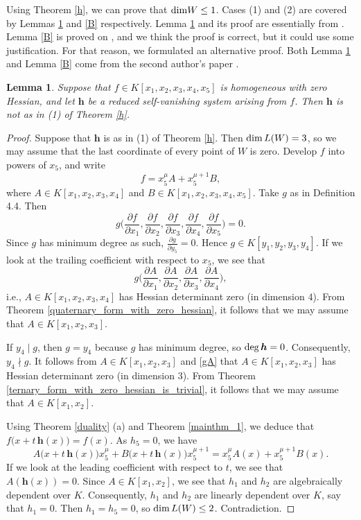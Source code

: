 \documentclass[12pt]{article}
\newtheorem{lemma}[theorem]{Lemma}
\theoremstyle{definition}
\theoremstyle{remark}
\def\dim{{\rm dim}}
\def\deg{{\rm deg}}
\def\pa{\partial}
\def\parder#1#2{\frac{\pa #1}{\pa #2}}
\begin{document}
Using Theorem \ref{h}, we can prove that $\dim W \le 1$. Cases (1) and (2) are 
covered by Lemmas \ref{A} and \ref{B} respectively. Lemma \ref{A} and its 
proof are essentially from \cite[p.\@ 567]{GNzzz}. Lemma \ref{B} is proved on 
\cite[p.\@ 568]{GNzzz}, and we think the proof is correct, but it could use some 
justification. For that reason, we formulated an alternative proof. Both 
Lemma \ref{A} and Lemma \ref{B} come from the second author's paper \cite{hmgqt5}.

\begin{lemma} \label{A}
Suppose that $f \in K[x_1,x_2,x_3,x_4,x_5]$ is homogeneous with zero Hessian, 
and let $\bm{h}$ be a reduced self-vanishing system arising from $f$. Then 
$\bm{h}$ is not as in {\upshape(1)} of Theorem \ref{h}.
\end{lemma}

\begin{proof}
Suppose that $\bm{h}$ is as in {\upshape(1)} of Theorem \ref{h}. Then
$\dim\, L(W) = 3$, so we may assume that the last coordinate of every point of 
$W$ is zero. Develop $f$ into powers of $x_5$, and write
$$
f = x_5^{\mu} A + x_5^{\mu+1} B,
$$
where $A \in K[x_1,x_2,x_3,x_4]$  and $B \in K[x_1,x_2,x_3,x_4,x_5]$.
Take $g$ as in Definition 4.4. Then
$$
g\Big(\parder{f}{x_1},\parder{f}{x_2},\parder{f}{x_3},\parder{f}{x_4},\parder{f}{x_5}\Big) = 0.
$$
Since $g$ has minimum degree as such, $\parder{g}{y_5} = 0$. 
Hence $g \in K[y_1,y_2,y_3,y_4]$. If we look at the trailing coefficient 
with respect to $x_5$, we see that 
\begin{equation} \label{gA}
g\Big(\parder{A}{x_1},\parder{A}{x_2},\parder{A}{x_3},\parder{A}{x_4}\Big), 
\end{equation}
i.e., $A \in K[x_1,x_2,x_3,x_4]$ has Hessian determinant zero (in dimension $4$). 
From Theorem \ref{quaternary_form_with_zero_hessian}, it follows that we may assume 
that $A \in K[x_1,x_2,x_3]$.

If $y_4 \mid g$, then $g = y_4$ because $g$ has minimum degree, so $\deg\, \bm{h} = 0$.
Consequently, $y_4 \nmid g$.
It follows from $A \in K[x_1,x_2,x_3]$ and 
\eqref{gA} that $A \in K[x_1,x_2,x_3]$ has Hessian determinant zero (in dimension $3$).
From Theorem \ref{ternary_form_with_zero_hessian_is_trivial}, 
it follows that we may assume that $A \in K[x_1,x_2]$.

Using Theorem \ref{duality} (a)  
and Theorem \ref{mainthm_1}, %
we deduce that 
$f\big(x +t\,\bm{h}(x)\big) = f(x)$. As $h_5 = 0$, we have
$$
A\big(x + t\,\bm{h}(x)\big) x_5^{\mu} + B\big(x + t\,\bm{h}(x)\big) x_5^{\mu+1} 
= x_5^{\mu} A(x) + x_5^{\mu+1} B(x).
$$
If we look at the leading coefficient with respect to $t$, we see that 
$A(\bm{h}(x)) = 0$. Since $A \in K[x_1,x_2]$, we see that $h_1$ and $h_2$ are algebraically
dependent over $K$. Consequently, $h_1$ and $h_2$ are linearly dependent
over $K$, say that $h_1 = 0$. Then $h_1 = h_5 = 0$, so $\dim\, L(W) \le 2$. 
Contradiction.
\end{proof}
\end{document}
